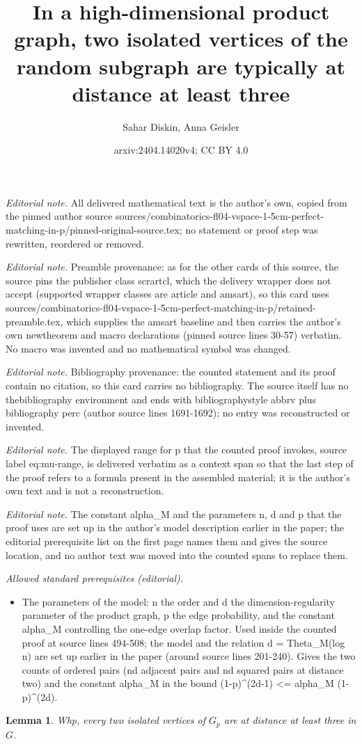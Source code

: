 \documentclass[10pt,a4paper]{amsart}
\title{In a high-dimensional product graph, two isolated vertices of the random subgraph are typically at distance at least three}
\author{Sahar Diskin, Anna Geisler}
\date{arxiv:2404.14020v4; CC BY 4.0}
\newtheorem{lemma}[thm]{Lemma}
\begin{document}
\maketitle
\noindent\textit{Editorial note.} All delivered mathematical text is the author's own, copied from the pinned author source sources/combinatorics-fl04-vspace-1-5cm-perfect-matching-in-p/pinned-original-source.tex; no statement or proof step was rewritten, reordered or removed.\par\medskip
\noindent\textit{Editorial note.} Preamble provenance: as for the other cards of this source, the source pins the publisher class scrartcl, which the delivery wrapper does not accept (supported wrapper classes are article and amsart), so this card uses sources/combinatorics-fl04-vspace-1-5cm-perfect-matching-in-p/retained-preamble.tex, which supplies the amsart baseline and then carries the author's own newtheorem and macro declarations (pinned source lines 30-57) verbatim. No macro was invented and no mathematical symbol was changed.\par\medskip
\noindent\textit{Editorial note.} Bibliography provenance: the counted statement and its proof contain no citation, so this card carries no bibliography. The source itself has no thebibliography environment and ends with bibliographystyle abbrv plus bibliography perc (author source lines 1691-1692); no entry was reconstructed or invented.\par\medskip
\noindent\textit{Editorial note.} The displayed range for p that the counted proof invokes, source label eq:mu-range, is delivered verbatim as a context span so that the last step of the proof refers to a formula present in the assembled material; it is the author's own text and is not a reconstruction.\par\medskip
\noindent\textit{Editorial note.} The constant alpha\_M and the parameters n, d and p that the proof uses are set up in the author's model description earlier in the paper; the editorial prerequisite list on the first page names them and gives the source location, and no author text was moved into the counted spans to replace them.\par\medskip
\noindent\textit{Allowed standard prerequisites (editorial).}\begin{itemize}
\item The parameters of the model: n the order and d the dimension-regularity parameter of the product graph, p the edge probability, and the constant alpha\_M controlling the one-edge overlap factor. Used inside the counted proof at source lines 494-508; the model and the relation d = Theta\_M(log n) are set up earlier in the paper (around source lines 201-240). Gives the two counts of ordered pairs (nd adjacent pairs and nd squared pairs at distance two) and the constant alpha\_M in the bound (1-p)\textasciicircum{}(2d-1) <= alpha\_M (1-p)\textasciicircum{}(2d).
\end{itemize}\medskip
\begin{lemma}\label{lem:isolates-far}
Whp, every two isolated vertices of $G_p$ are at distance at least three in $G$.
\end{lemma}
\end{document}
